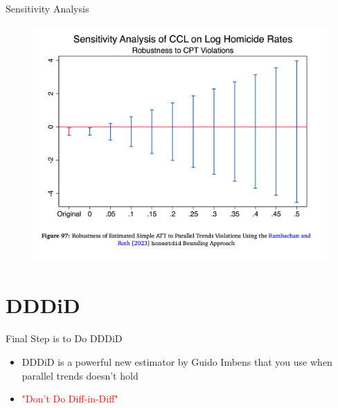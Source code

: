 \documentclass{beamer}
\begin{document}
\begin{frame}{Sensitivity Analysis}

	\begin{figure}
    \includegraphics[height=0.85\textheight]{./lecture_includes/step9_roth}
	\end{figure}

\end{frame}






\section{DDDiD}





\begin{frame}{Final Step is to Do DDDiD}

\begin{itemize}
\item DDDiD is a powerful new estimator by Guido Imbens that you use when parallel trends doesn't hold
\pause
\item \textcolor{red}{"Don't Do Diff-in-Diff"}

\end{itemize}

\end{frame}
\end{document}
